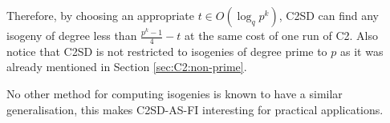 Therefore, by choosing an appropriate $t\in O(\log_q p^k)$, C2SD can
find any isogeny of degree less than $\frac{p^k-1}{4}-t$ at the same
cost of one run of C2. Also notice that C2SD is not restricted to
isogenies of degree prime to $p$ as it was already mentioned in
Section \ref{sec:C2:non-prime}.

No other method for computing isogenies is known to have a similar
generalisation, this makes C2SD-AS-FI interesting for practical
applications.




%
